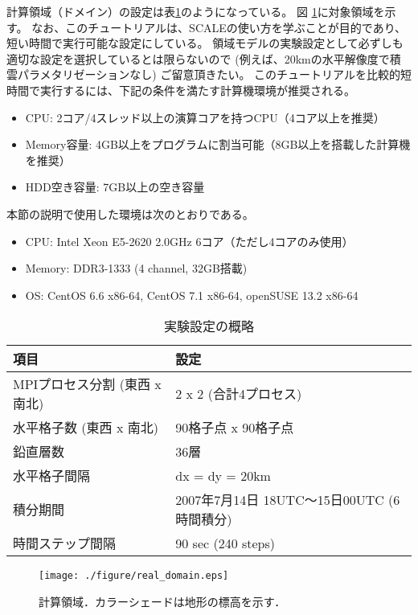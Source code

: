 計算領域（ドメイン）の設定は表\ref{tab:grids}のようになっている。
図 \ref{fig:tutrial_real_domain}に対象領域を示す。
なお、このチュートリアルは、SCALEの使い方を学ぶことが目的であり、
短い時間で実行可能な設定にしている。
領域モデルの実験設定として必ずしも適切な設定を選択しているとは限らないので
(例えば、20kmの水平解像度で積雲パラメタリゼーションなし)
ご留意頂きたい。
このチュートリアルを比較的短時間で実行するには、下記の条件を満たす計算機環境が推奨される。
\begin{itemize}
\item CPU: 2コア/4スレッド以上の演算コアを持つCPU（4コア以上を推奨）
\item Memory容量: 4GB以上をプログラムに割当可能（8GB以上を搭載した計算機を推奨）
\item HDD空き容量: 7GB以上の空き容量
\end{itemize}
本節の説明で使用した環境は次のとおりである。
\begin{itemize}
\item CPU: Intel Xeon E5-2620 2.0GHz 6コア（ただし4コアのみ使用）
\item Memory: DDR3-1333 (4 channel, 32GB搭載)
\item OS: CentOS 6.6 x86-64, CentOS 7.1 x86-64, openSUSE 13.2 x86-64
\end{itemize}


\begin{table}[h]
\begin{center}
  \caption{実験設定の概略}
  \label{tab:grids}
  \begin{tabularx}{150mm}{|l|X|} \hline
    \rowcolor[gray]{0.9} 項目 & 設定 \\ \hline
    MPIプロセス分割 (東西 x 南北) & 2 x 2 (合計4プロセス) \\ \hline
    水平格子数 (東西 x 南北) & 90格子点 x 90格子点 \\ \hline
    鉛直層数                 & 36層                  \\ \hline
    水平格子間隔             & dx = dy = 20km       \\ \hline
    積分期間 & 2007年7月14日 18UTC～15日00UTC (6時間積分) \\ \hline
    時間ステップ間隔 & 90 sec (240 steps) \\ \hline
  \end{tabularx}
\end{center}
\end{table}

\begin{figure}[tb]
\begin{center}
  \texttt{[image: ./figure/real\_domain.eps]}\\
  \caption{計算領域．カラーシェードは地形の標高を示す．}
  \label{fig:tutrial_real_domain}
\end{center}
\end{figure}


